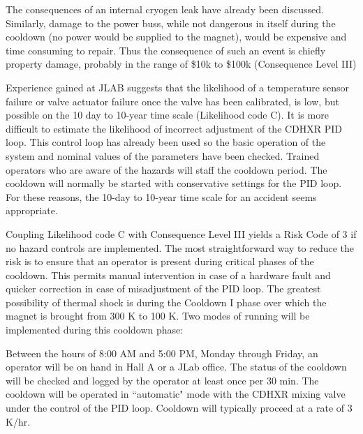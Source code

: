 {The consequences of an internal cryogen leak have already been discussed.  Similarly, 
damage to the power buss, while not dangerous in itself during the cooldown (no power would be supplied 
to the magnet), would be expensive and time consuming to repair.  Thus the consequence of such an event 
is chiefly property damage, probably in the range of \$10k to \$100k (Consequence Level III)

Experience gained at JLAB suggests that the likelihood of a temperature sensor failure or valve actuator 
failure once the valve has been calibrated, is low, but possible on the 10 day to 10-year time scale 
(Likelihood code C).  It is more difficult to estimate the likelihood of incorrect adjustment of the CDHXR 
PID loop.  This control loop has already been used so the basic operation of the system and nominal 
values of the parameters have been checked.  Trained operators who are aware of the hazards will staff 
the cooldown period.  The cooldown will normally be started with conservative settings for the PID loop.  
For these reasons, the 10-day to 10-year time scale for an accident seems appropriate.

Coupling Likelihood code C with Consequence Level III yields a Risk Code of 3 if no hazard controls are 
implemented.  The most straightforward way to reduce the risk is to ensure that an operator is present 
during critical phases of the cooldown. This permits manual intervention in case of a hardware fault and 
quicker correction in case of misadjustment of the PID loop.  The greatest possibility of thermal shock 
is during the Cooldown I phase over which the magnet is brought from 300 K to 100 K.  Two modes of running 
will be implemented during this cooldown phase:

\begin{list}{.~}{\setlength{\itemsep}{-0.15cm}}
  \item Between the hours of 8:00 AM and 5:00 PM, Monday through Friday, an operator will be on hand 
      in Hall A or a JLab office.  The status of the cooldown will be checked and logged by the operator at least 
     once per 30 min.  The cooldown will be operated in ``automatic" mode with the CDHXR mixing valve under the 
     control of the PID loop.  Cooldown will typically proceed at a rate of 3 K/hr.


\end{list}}

